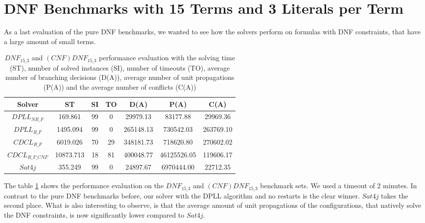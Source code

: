 \section{DNF Benchmarks with 15 Terms and 3 Literals per Term}
\label{sec:dnf153}

As a last evaluation of the pure DNF benchmarks, we wanted to see how the solvers perform on formulas with DNF constraints, that have a large amount of small terms.

\begin{table}[!htb]
\centering
\caption[$DNF_{15\_3}$ and $(CNF)DNF_{15\_3}$ performance evaluation]{$DNF_{15\_3}$ and $(CNF)DNF_{15\_3}$ performance evaluation with the solving time (ST), number of solved instances (SI), number of timeouts (TO), average number of branching decisions (D(A)), average number of unit propagations (P(A)) and the average number of conflicts (C(A))}
\label{tab:dnf153Sat}
\begin{tabular}{|c|c|c|c|c|c|c|}
\hline
Solver & ST & SI & TO & D(A) & P(A) & C(A)\\ 
\hline
$DPLL_{NR\_F}$ & 169.861 & 99 & 0 & 29979.13 & 83177.88 & 29969.36 \\ 
\hline
$DPLL_{R\_F}$ & 1495.094 & 99 & 0 & 265148.13 & 730542.03 & 263769.10 \\ 
\hline
$CDCL_{R\_F}$ & 6019.026 & 70 & 29 & 348181.73 & 718620.80 & 270602.02 \\ 
\hline
$CDCL_{R\_F\_CNF}$ & 10873.713 & 18 & 81 & 400048.77 & 46125526.05 & 119606.17 \\ 
\hline
$Sat4j$ & 355.249 & 99 & 0 & 24897.67 & 6970444.00 & 22712.35 \\ 
\hline
\end{tabular}
\end{table}

The table \ref{tab:dnf153Sat} shows the performance evaluation on the $DNF_{15\_3}$ and $(CNF)DNF_{15\_3}$ benchmark sets. We used a timeout of 2 minutes. In contrast to the pure DNF benchmarks before, our solver with the DPLL algorithm and no restarts is the clear winner. $Sat4j$ takes the second place. What is also interesting to observe, is that the average amount of unit propagations of the configurations, that natively solve the DNF constraints, is now significantly lower compared to $Sat4j$.

